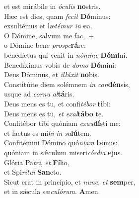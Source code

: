 \evenverse et est mirábile in \textit{ó}\textit{cu}\textit{lis} \textbf{no}stris.\\
\oddverse Hæc est dies, quam \textit{fe}\textit{cit} \textbf{Dó}minus:~\*\\
\oddverse exsultémus et læ\textit{té}\textit{mur} \textit{in} \textbf{e}a.\\
\evenverse O Dómine, salvum me fac,~+\\
\evenverse  o Dómine bene \textit{pro}\textit{spe}\textbf{rá}re:~\*\\
\evenverse benedíctus qui venit in \textit{nó}\textit{mi}\textit{ne} \textbf{Dó}\textbf{mi}ni.\\
\oddverse Benedíximus vobis de \textit{do}\textit{mo} \textbf{Dó}mini:~\*\\
\oddverse Deus Dóminus, et \textit{il}\textit{lú}\textit{xit} \textbf{no}bis.\\
\evenverse Constitúite diem solémnem \textit{in} \textit{con}\textbf{dén}sis,~\*\\
\evenverse usque ad \textit{cor}\textit{nu} \textit{al}\textbf{tá}ris.\\
\oddverse Deus meus es tu, et confi\textit{té}\textit{bor} \textbf{ti}bi:~\*\\
\oddverse Deus meus es tu, \textit{et} \textit{e}\textit{xal}\textbf{tá}\textbf{bo} te.\\
\evenverse Confitébor tibi quóniam \textit{e}\textit{xau}\textbf{dí}sti me:~\*\\
\evenverse et factus es mi\textit{hi} \textit{in} \textit{sa}\textbf{lú}tem.\\
\oddverse Confitémini Dómino quó\textit{ni}\textit{am} \textbf{bo}nus:~\*\\
\oddverse quóniam in sǽculum miseri\textit{cór}\textit{di}\textit{a} \textbf{e}jus.\\
\evenverse Glória Pa\textit{tri}, \textit{et} \textbf{Fí}lio,~\*\\
\evenverse et Spi\textit{rí}\textit{tu}\textit{i} \textbf{San}cto.\\
\oddverse Sicut erat in princípio, et \textit{nunc}, \textit{et} \textbf{sem}per,~\*\\
\oddverse et in sǽcula sæ\textit{cu}\textit{ló}\textit{rum}. \textbf{A}men.\\
